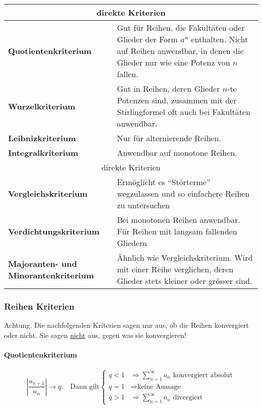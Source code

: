 \begin{tabular}{|p{4cm}|p{15cm}|}\hline
\multicolumn{2}{|c|}{direkte Kriterien}\\ \hline

\textbf{Quotientenkriterium} & Gut für Reihen, die Fakultäten oder Glieder der
Form $a^n$ enthalten. Nicht auf Reihen anwendbar, in denen die Glieder nur wie
eine Potenz von $n$ fallen. \\ \hline

\textbf{Wurzelkriterium} & Gut in Reihen, deren Glieder $n$-te Potenzen sind,
zusammen mit der Stirlingformel oft auch bei Fakultäten anwendbar. \\ \hline

\textbf{Leibnizkriterium} & Nur für alternierende Reihen.\\ \hline

\textbf{Integralkriterium} & Anwendbar auf monotone Reihen.\\ \hline

\multicolumn{2}{|c|}{direkte Kriterien}\\ \hline

\textbf{Vergleichskriterium} & Ermöglicht es "`Störterme"' wegzulassen und so
einfachere Reihen zu untersuchen \\ \hline

\textbf{Verdichtungskriterium} & Bei monotonen Reihen anwendbar. Für Reihen mit
langsam fallenden Gliedern \\ \hline

\textbf{Majoranten- und Minorantenkriterium} & Ähnlich wie Vergleichskriterium.
Wird mit einer Reihe verglichen, deren Glieder stets kleiner oder grösser sind.
\\ \hline
\end{tabular}

\twocolumn

\subsubsection{Reihen Kriterien}
Achtung. Die nachfolgenden Kriterien sagen nur aus, ob die Reihen konvergiert
oder nicht. Sie sagen \underline{nicht} aus, gegen was sie konvergieren!

\paragraph{Quotientenkriterium}
\[
\left| \frac{a_{n+1}}{a_n} \right| \to q. \quad \text{Dann gilt} \begin{cases}
q < 1 & \Rightarrow \sum_{n=1}^\infty a_n \text{ konvergiert absolut} \\
q = 1 & \Rightarrow \text{keine Aussage}\\
q > 1 & \Rightarrow \sum_{n=1}^\infty a_n \text{ divergiert}
\end{cases}
\]

